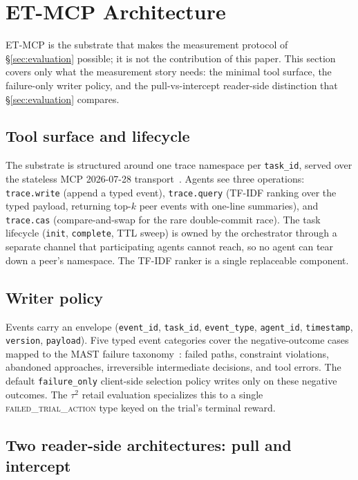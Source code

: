 \section{ET-MCP Architecture}
\label{sec:architecture}

ET-MCP is the substrate that makes the measurement protocol of
\S\ref{sec:evaluation} possible; it is not the contribution of
this paper. This section covers only what the measurement story
needs: the minimal tool surface, the failure-only writer policy,
and the pull-vs-intercept reader-side distinction that
\S\ref{sec:evaluation} compares.

\subsection{Tool surface and lifecycle}
\label{sec:arch:tools}
\label{sec:arch:lifecycle-write-query}

The substrate is structured around one trace namespace per
\texttt{task\_id}, served over the stateless MCP 2026-07-28
transport~\cite{mcpspec2026}. Agents see three operations:
\texttt{trace.write} (append a typed event),
\texttt{trace.query} (TF-IDF ranking over the typed payload,
returning top-$k$ peer events with one-line summaries), and
\texttt{trace.cas} (compare-and-swap for the rare double-commit
race). The task lifecycle (\texttt{init}, \texttt{complete}, TTL
sweep) is owned by the orchestrator through a separate channel
that participating agents cannot reach, so no agent can tear down
a peer's namespace. The TF-IDF ranker is a single replaceable
component.

\subsection{Writer policy}
\label{sec:arch:taxonomy}

Events carry an envelope (\texttt{event\_id}, \texttt{task\_id},
\texttt{event\_type}, \texttt{agent\_id}, \texttt{timestamp},
\texttt{version}, \texttt{payload}). Five typed event categories
cover the negative-outcome cases mapped to the MAST failure
taxonomy~\cite{mast2025}: failed paths, constraint violations,
abandoned approaches, irreversible intermediate decisions, and
tool errors. The default \texttt{failure\_only} client-side
selection policy writes only on these negative outcomes. The
$\tau^2$ retail evaluation specializes this to a single
\textsc{failed\_trial\_action} type keyed on the trial's terminal
reward.

\subsection{Two reader-side architectures: pull and intercept}
\label{sec:arch:pull-vs-intercept}

